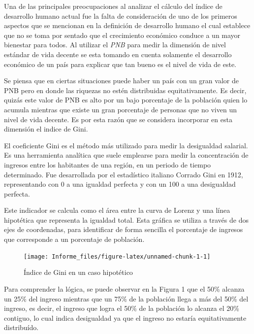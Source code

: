 \documentclass[
  10pt,
]{article}
\begin{document}
Una de las principales preocupaciones al analizar el cálculo del índice
de desarrollo humano actual fue la falta de consideración de uno de los
primeros aspectos que se mencionan en la definición de desarrollo humano
el cual establece que no se toma por sentado que el crecimiento
económico conduce a un mayor bienestar para todos. Al utilizar el
\emph{PNB} para medir la dimensión de nivel estándar de vida decente se
esta tomando en cuenta solamente el desarrollo económico de un país para
explicar que tan bueno es el nivel de vida de este.

Se piensa que en ciertas situaciones puede haber un país con un gran
valor de PNB pero en donde las riquezas no estén distribuidas
equitativamente. Es decir, quizás este valor de PNB es alto por un bajo
porcentaje de la población quien lo acumula mientras que existe un gran
porcentaje de personas que no viven un nivel de vida decente. Es por
esta razón que se considera incorporar en esta dimensión el indice de
Gini.

El coeficiente Gini es el método más utilizado para medir la desigualdad
salarial. Es una herramienta analítica que suele emplearse para medir la
concentración de ingresos entre los habitantes de una región, en un
periodo de tiempo determinado. Fue desarrollada por el estadístico
italiano Corrado Gini en 1912, representando con 0 a una igualdad
perfecta y con un 100 a una desigualdad perfecta.

Este indicador se calcula como el área entre la curva de Lorenz y una
línea hipotética que representa la igualdad total. Esta gráfica se
utiliza a través de dos ejes de coordenadas, para identificar de forma
sencilla el porcentaje de ingresos que corresponde a un porcentaje de
población.

\begin{figure}

{\centering \texttt{[image: Informe\_files/figure-latex/unnamed-chunk-1-1]} 

}

\caption{Índice de Gini en un caso hipotético}\label{fig:unnamed-chunk-1}
\end{figure}

Para comprender la lógica, se puede observar en la Figura 1 que el 50\%
alcanza un 25\% del ingreso mientras que un 75\% de la población llega a
más del 50\% del ingreso, es decir, el ingreso que logra el 50\% de la
población lo alcanza el 20\% contiguo, lo cual indica desigualdad ya que
el ingreso no estaría equitativamente distribuído.
\end{document}

